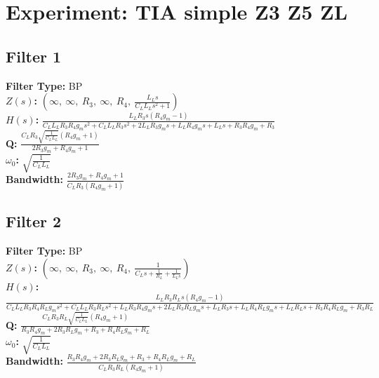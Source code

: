 \documentclass{article}
\begin{document}
        \section*{Experiment: TIA simple Z3 Z5 ZL}
\subsection*{Filter 1}
\textbf{Filter Type:} BP \\ 
\textbf{$Z(s)$:} $\left( \infty, \  \infty, \  R_{3}, \  \infty, \  R_{4}, \  \frac{L_{L} s}{C_{L} L_{L} s^{2} + 1}\right)$ \\ 
\textbf{$H(s)$:} $\frac{L_{L} R_{3} s \left(R_{4} g_{m} - 1\right)}{C_{L} L_{L} R_{3} R_{4} g_{m} s^{2} + C_{L} L_{L} R_{3} s^{2} + 2 L_{L} R_{3} g_{m} s + L_{L} R_{4} g_{m} s + L_{L} s + R_{3} R_{4} g_{m} + R_{3}}$ \\ 
\textbf{Q:} $\frac{C_{L} R_{3} \sqrt{\frac{1}{C_{L} L_{L}}} \left(R_{4} g_{m} + 1\right)}{2 R_{3} g_{m} + R_{4} g_{m} + 1}$ \\ 
\textbf{$\omega_0$:} $\sqrt{\frac{1}{C_{L} L_{L}}}$ \\ 
\textbf{Bandwidth:} $\frac{2 R_{3} g_{m} + R_{4} g_{m} + 1}{C_{L} R_{3} \left(R_{4} g_{m} + 1\right)}$ \\ 
\subsection*{Filter 2}
\textbf{Filter Type:} BP \\ 
\textbf{$Z(s)$:} $\left( \infty, \  \infty, \  R_{3}, \  \infty, \  R_{4}, \  \frac{1}{C_{L} s + \frac{1}{R_{L}} + \frac{1}{L_{L} s}}\right)$ \\ 
\textbf{$H(s)$:} $\frac{L_{L} R_{3} R_{L} s \left(R_{4} g_{m} - 1\right)}{C_{L} L_{L} R_{3} R_{4} R_{L} g_{m} s^{2} + C_{L} L_{L} R_{3} R_{L} s^{2} + L_{L} R_{3} R_{4} g_{m} s + 2 L_{L} R_{3} R_{L} g_{m} s + L_{L} R_{3} s + L_{L} R_{4} R_{L} g_{m} s + L_{L} R_{L} s + R_{3} R_{4} R_{L} g_{m} + R_{3} R_{L}}$ \\ 
\textbf{Q:} $\frac{C_{L} R_{3} R_{L} \sqrt{\frac{1}{C_{L} L_{L}}} \left(R_{4} g_{m} + 1\right)}{R_{3} R_{4} g_{m} + 2 R_{3} R_{L} g_{m} + R_{3} + R_{4} R_{L} g_{m} + R_{L}}$ \\ 
\textbf{$\omega_0$:} $\sqrt{\frac{1}{C_{L} L_{L}}}$ \\ 
\textbf{Bandwidth:} $\frac{R_{3} R_{4} g_{m} + 2 R_{3} R_{L} g_{m} + R_{3} + R_{4} R_{L} g_{m} + R_{L}}{C_{L} R_{3} R_{L} \left(R_{4} g_{m} + 1\right)}$ \\ 
\end{document}
